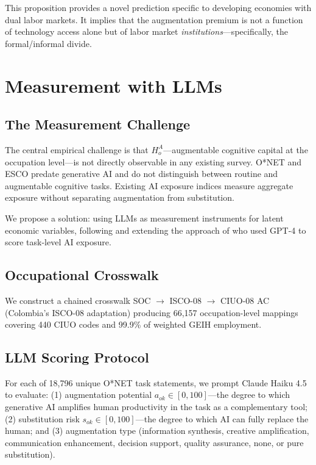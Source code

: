 \documentclass[a4paper,fleqn]{cas-dc}
\begin{document}
This proposition provides a novel prediction specific to developing economies with dual labor markets. It implies that the augmentation premium is not a function of technology access alone but of labor market \textit{institutions}---specifically, the formal/informal divide.


\section{Measurement with LLMs}
\label{sec:measurement}

\subsection{The Measurement Challenge}

The central empirical challenge is that $H_o^A$---augmentable cognitive capital at the occupation level---is not directly observable in any existing survey. O*NET and ESCO predate generative AI and do not distinguish between routine and augmentable cognitive tasks. Existing AI exposure indices \citep{felten2021occupational, webb2020impact} measure aggregate exposure without separating augmentation from substitution.

We propose a solution: using LLMs as measurement instruments for latent economic variables, following and extending the approach of \citet{eloundou2024gpts} who used GPT-4 to score task-level AI exposure.

\subsection{Occupational Crosswalk}

We construct a chained crosswalk SOC $\to$ ISCO-08 $\to$ CIUO-08 AC (Colombia's ISCO-08 adaptation) producing 66,157 occupation-level mappings covering 440 CIUO codes and 99.9\% of weighted GEIH employment.

\subsection{LLM Scoring Protocol}

For each of 18,796 unique O*NET task statements, we prompt Claude Haiku 4.5 \citep{anthropic2025} to evaluate: (1) augmentation potential $a_{ok} \in [0, 100]$---the degree to which generative AI amplifies human productivity in the task as a complementary tool; (2) substitution risk $s_{ok} \in [0, 100]$---the degree to which AI can fully replace the human; and (3) augmentation type (information synthesis, creative amplification, communication enhancement, decision support, quality assurance, none, or pure substitution).
\end{document}
